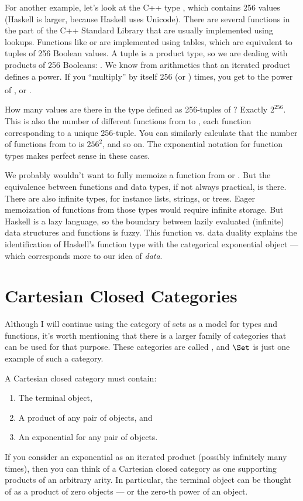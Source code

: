 For another example, let's look at the C++ type , which
contains 256 values (Haskell  is larger, because Haskell
uses Unicode). There are several functions in the part of the
C++ Standard Library that are usually implemented using lookups.
Functions like  or  are implemented
using tables, which are equivalent to tuples of 256 Boolean values. A
tuple is a product type, so we are dealing with products of 256
Booleans: . We know from
arithmetics that an iterated product defines a power. If you
``multiply''  by itself 256 (or ) times, you
get  to the power of , or \textsuperscript{}.

How many values are there in the type defined as 256-tuples of
? Exactly $2^{256}$. This is also the number
of different functions from  to , each
function corresponding to a unique 256-tuple. You can similarly
calculate that the number of functions from  to
 is $256^{2}$, and so on. The exponential
notation for function types makes perfect sense in these cases.

We probably wouldn't want to fully memoize a function from 
or . But the equivalence between functions and data
types, if not always practical, is there. There are also infinite types,
for instance lists, strings, or trees. Eager memoization of functions
from those types would require infinite storage. But Haskell is a lazy
language, so the boundary between lazily evaluated (infinite) data
structures and functions is fuzzy. This function vs. data duality
explains the identification of Haskell's function type with the
categorical exponential object --- which corresponds more to our idea of
\emph{data}.

\section{Cartesian Closed Categories}

Although I will continue using the category of sets as a model for types
and functions, it's worth mentioning that there is a larger family of
categories that can be used for that purpose. These categories are
called , and $\Set$ is just one example of
such a category.

A Cartesian closed category must contain:

\begin{enumerate}
\tightlist
\item
  The terminal object,
\item
  A product of any pair of objects, and
\item
  An exponential for any pair of objects.
\end{enumerate}
If you consider an exponential as an iterated product (possibly
infinitely many times), then you can think of a Cartesian closed
category as one supporting products of an arbitrary arity. In
particular, the terminal object can be thought of as a product of zero
objects --- or the zero-th power of an object.


